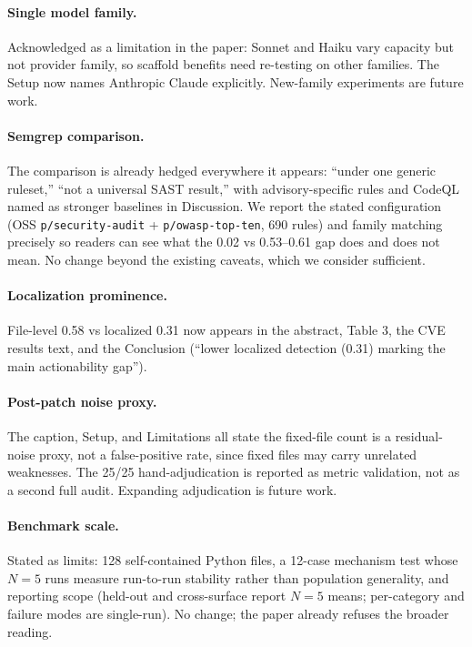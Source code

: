 \documentclass[11pt,a4paper]{article}
\begin{document}
\paragraph{Single model family.} Acknowledged as a limitation in the paper: Sonnet and Haiku vary capacity but not provider family, so scaffold benefits need re-testing on other families. The Setup now names Anthropic Claude explicitly. New-family experiments are future work.

\paragraph{Semgrep comparison.} The comparison is already hedged everywhere it appears: ``under one generic ruleset,'' ``not a universal SAST result,'' with advisory-specific rules and CodeQL named as stronger baselines in Discussion. We report the stated configuration (OSS \texttt{p/security-audit} + \texttt{p/owasp-top-ten}, 690 rules) and family matching precisely so readers can see what the 0.02 vs 0.53--0.61 gap does and does not mean. No change beyond the existing caveats, which we consider sufficient.

\paragraph{Localization prominence.} File-level 0.58 vs localized 0.31 now appears in the abstract, Table 3, the CVE results text, and the Conclusion (``lower localized detection (0.31) marking the main actionability gap'').

\paragraph{Post-patch noise proxy.} The caption, Setup, and Limitations all state the fixed-file count is a residual-noise proxy, not a false-positive rate, since fixed files may carry unrelated weaknesses. The 25/25 hand-adjudication is reported as metric validation, not as a second full audit. Expanding adjudication is future work.

\paragraph{Benchmark scale.} Stated as limits: 128 self-contained Python files, a 12-case mechanism test whose $N{=}5$ runs measure run-to-run stability rather than population generality, and reporting scope (held-out and cross-surface report $N{=}5$ means; per-category and failure modes are single-run). No change; the paper already refuses the broader reading.
\end{document}
